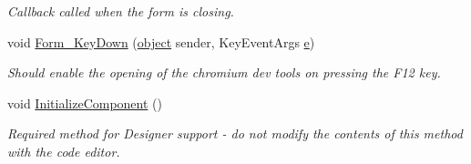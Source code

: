 \begin{DoxyCompactItemize}
\begin{DoxyCompactList}\small\item\em Callback called when the form is closing. \end{DoxyCompactList}\item 
void \hyperlink{class_web_analyzer_1_1_u_i_1_1_h_t_m_l_u_i_a4ac4c943e02d07235a52edf88d2cc055}{Form\+\_\+\+Key\+Down} (\hyperlink{_u_i_2_h_t_m_l_resources_2js_2lib_2underscore_8min_8js_aae18b7515bb2bc4137586506e7c0c903}{object} sender, Key\+Event\+Args \hyperlink{_u_i_2_h_t_m_l_resources_2js_2lib_2bootstrap_8min_8js_ab5902775854a8b8440bcd25e0fe1c120}{e})
\begin{DoxyCompactList}\small\item\em Should enable the opening of the chromium dev tools on pressing the F12 key. \end{DoxyCompactList}\item 
void \hyperlink{class_web_analyzer_1_1_u_i_1_1_h_t_m_l_u_i_a982fd123521466139710256dee65f7c4}{Initialize\+Component} ()
\begin{DoxyCompactList}\small\item\em Required method for Designer support -\/ do not modify the contents of this method with the code editor. \end{DoxyCompactList}\end{DoxyCompactItemize}
